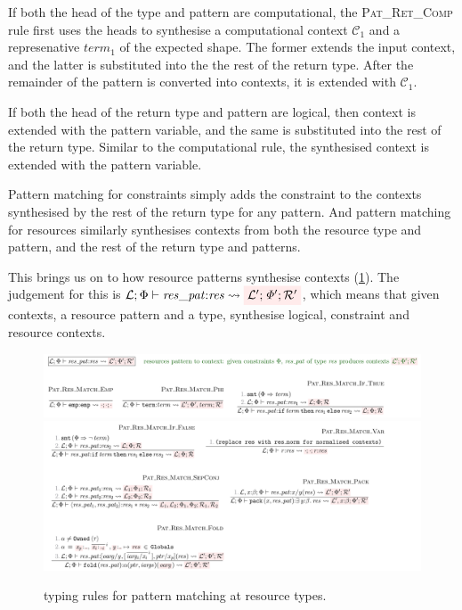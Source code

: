 If both the head of the type and pattern are computational, the
\textsc{Pat\_Ret\_Comp} rule first uses the heads to synthesise a computational
context $\mathcal{C}_1$ and a represenative $\mathit{term}_1$ of the expected
shape. The former extends the input context, and the latter is substituted into
the the rest of the return type. After the remainder of the pattern is
converted into contexts, it is extended with $\mathcal{C}_1$.

If both the head of the return type and pattern are logical, then context is
extended with the pattern variable, and the same is
substituted into the rest of the return type. Similar to the computational
rule, the synthesised context is extended with the pattern variable.

Pattern matching for constraints simply adds the constraint to the contexts
synthesised by the rest of the return type for any pattern. And pattern
matching for resources similarly synthesises contexts from both the
resource type and pattern, and the rest of the return type and patterns.

This brings us on to how resource patterns synthesise contexts
(\cref{fig:typing-res-pat}). The judgement for this is $\mathcal{L}; \Phi
\vdash \mathit{res\_pat}{:}\mathit{res} \rightsquigarrow \outpol{\mathcal{L}';
\Phi'; \mathcal{R}'}$, which means that given contexts, a resource pattern and a type, synthesise
logical, constraint and resource contexts.

\begin{figure}[tp]
    \includegraphics{figures/kernel-res-pat-typing-1}
    \includegraphics{figures/kernel-res-pat-typing-2}
    \caption{ typing rules for pattern matching at resource
        types.}\label{fig:typing-res-pat}
\end{figure}

